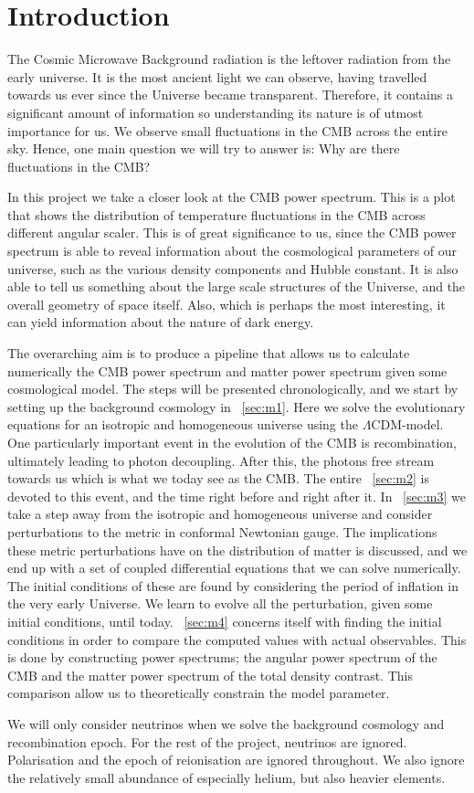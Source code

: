 \section{Introduction}\label{sec:introduction}

The Cosmic Microwave Background radiation is the leftover radiation from the early universe. It is the most ancient light we can observe, having travelled towards us ever since the Universe became transparent. Therefore, it contains a significant amount of information so understanding its nature is of utmost importance for us. We observe small fluctuations in the CMB across the entire sky. Hence, one main question we will try to answer is: Why are there fluctuations in the CMB? 

In this project we take a closer look at the CMB power spectrum. This is a plot that shows the distribution of temperature fluctuations in the CMB across different angular scaler. This is of great significance to us, since the CMB power spectrum is able to reveal information about the cosmological parameters of our universe, such as the various density components and Hubble constant. It is also able to tell us something about the large scale structures of the Universe, and the overall geometry of space itself. Also, which is perhaps the most interesting, it can yield information about the nature of dark energy. 

The overarching aim is to produce a pipeline that allows us to calculate numerically the CMB power spectrum and matter power spectrum given some cosmological model. The steps will be presented chronologically, and we start by setting up the background cosmology in ~\cref{sec:m1}. Here we solve the evolutionary equations for an isotropic and homogeneous universe using the $\Lambda$CDM-model. One particularly important event in the evolution of the CMB is recombination, ultimately leading to photon decoupling. After this, the photons free stream towards us which is what we today see as the CMB. The entire ~\cref{sec:m2} is devoted to this event, and the time right before and right after it. In ~\cref{sec:m3} we take a step away from the isotropic and homogeneous universe and consider perturbations to the metric in conformal Newtonian gauge. The implications these metric perturbations have on the distribution of matter is discussed, and we end up with a set of coupled differential equations that we can solve numerically. The initial conditions of these are found by considering the period of inflation in the very early Universe. We learn to evolve all the perturbation, given some initial conditions, until today. ~\cref{sec:m4} concerns itself with finding the initial conditions in order to compare the computed values with actual observables. This is done by constructing power spectrums; the angular power spectrum of the CMB and the matter power spectrum of the total density contrast. This comparison allow us to theoretically constrain the model parameter.  

We will only consider neutrinos when we solve the background cosmology and recombination epoch. For the rest of the project, neutrinos are ignored. Polarisation and the epoch of reionisation are ignored throughout. We also ignore the relatively small abundance of especially helium, but also heavier elements. 